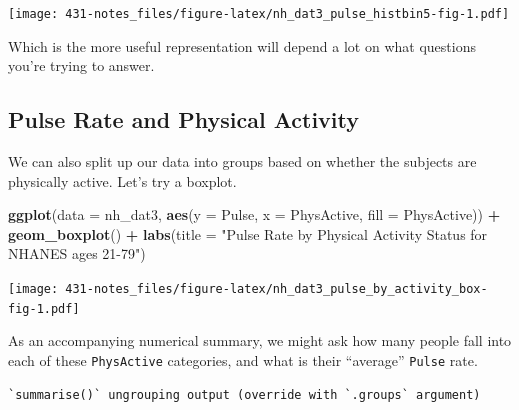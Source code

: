 \documentclass[
]{book}
\newenvironment{Shaded}{\begin{snugshade}}{\end{snugshade}}
\newcommand{\DataTypeTok}[1]{\textcolor[rgb]{0.13,0.29,0.53}{#1}}
\newcommand{\DecValTok}[1]{\textcolor[rgb]{0.00,0.00,0.81}{#1}}
\newcommand{\KeywordTok}[1]{\textcolor[rgb]{0.13,0.29,0.53}{\textbf{#1}}}
\newcommand{\NormalTok}[1]{#1}
\newcommand{\OperatorTok}[1]{\textcolor[rgb]{0.81,0.36,0.00}{\textbf{#1}}}
\newcommand{\StringTok}[1]{\textcolor[rgb]{0.31,0.60,0.02}{#1}}
\begin{document}
\texttt{[image: 431-notes\_files/figure-latex/nh\_dat3\_pulse\_histbin5-fig-1.pdf]}

Which is the more useful representation will depend a lot on what questions you're trying to answer.

\hypertarget{pulse-rate-and-physical-activity}{%
\subsection{Pulse Rate and Physical Activity}\label{pulse-rate-and-physical-activity}}

We can also split up our data into groups based on whether the subjects are physically active. Let's try a boxplot.

\begin{Shaded}
\begin{Highlighting}[]
\KeywordTok{ggplot}\NormalTok{(}\DataTypeTok{data =}\NormalTok{ nh_dat3, }\KeywordTok{aes}\NormalTok{(}\DataTypeTok{y =}\NormalTok{ Pulse, }\DataTypeTok{x =}\NormalTok{ PhysActive, }\DataTypeTok{fill =}\NormalTok{ PhysActive)) }\OperatorTok{+}\StringTok{ }
\StringTok{    }\KeywordTok{geom_boxplot}\NormalTok{() }\OperatorTok{+}\StringTok{ }
\StringTok{    }\KeywordTok{labs}\NormalTok{(}\DataTypeTok{title =} \StringTok{"Pulse Rate by Physical Activity Status for NHANES ages 21-79"}\NormalTok{)}
\end{Highlighting}
\end{Shaded}

\texttt{[image: 431-notes\_files/figure-latex/nh\_dat3\_pulse\_by\_activity\_box-fig-1.pdf]}

As an accompanying numerical summary, we might ask how many people fall into each of these \texttt{PhysActive} categories, and what is their ``average'' \texttt{Pulse} rate.

\begin{Shaded}
\end{Shaded}

\begin{verbatim}
`summarise()` ungrouping output (override with `.groups` argument)
\end{verbatim}
\end{document}
